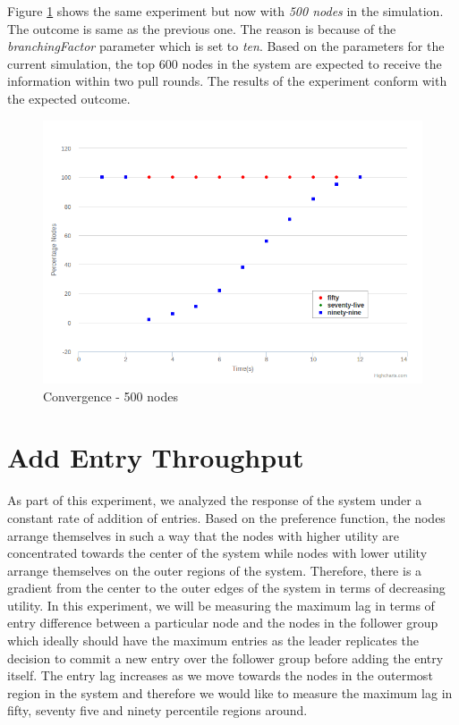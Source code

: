 \documentclass[a4paper,11pt]{kth-mag}
\begin{document}
Figure \ref{fig:500conv} shows the same experiment but now with \textit{500 nodes} in the simulation. The outcome is same as the previous one. The reason is because of the \textit{branchingFactor} parameter which is set to \textit{ten}. Based on the parameters for the current simulation, the top 600 nodes in the system are expected to receive the information within two pull rounds. The results of the experiment conform with the expected outcome.


\begin{figure}
	\includegraphics[scale=0.5]{500Convergence}
	\caption{Convergence - 500 nodes}
	\label{fig:500conv}
\end{figure}


\section{Add Entry Throughput}

As part of this experiment, we analyzed the response of the system under a constant rate of addition of entries. Based on the preference function, the nodes arrange themselves in such a way that the nodes with higher utility are concentrated towards the center of the system while nodes with lower utility arrange themselves on the outer regions of the system. Therefore, there is a gradient from the center to the outer edges of the system in terms of decreasing utility. In this experiment, we will be measuring the maximum lag in terms of entry difference between a particular node and the nodes in the follower group which ideally should have the maximum entries as the leader replicates the decision to commit a new entry over the follower group before adding the entry itself. The entry lag increases as we move towards the nodes in the outermost region in the system and therefore we would like to measure the maximum lag in fifty, seventy five and ninety percentile regions around.
\end{document}
